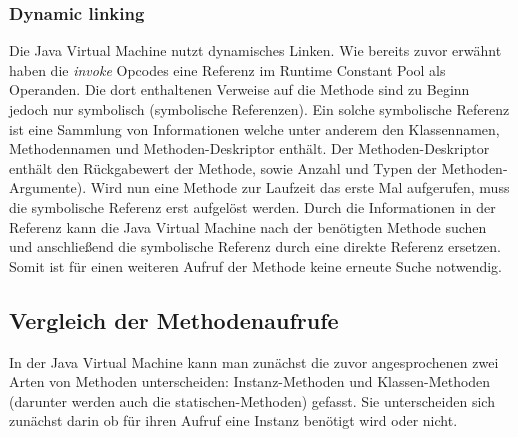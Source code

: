 \documentclass[conference]{IEEEtran}
\begin{document}
\subsubsection{Dynamic linking}
Die Java Virtual Machine nutzt dynamisches Linken. Wie bereits zuvor erwähnt haben die \textit{invoke} Opcodes eine Referenz im Runtime Constant Pool als Operanden. Die dort enthaltenen Verweise auf die Methode sind zu Beginn jedoch nur symbolisch (symbolische Referenzen). Ein solche symbolische Referenz ist eine Sammlung von Informationen welche unter anderem den Klassennamen, Methodennamen und Methoden-Deskriptor enthält. Der Methoden-Deskriptor enthält den Rückgabewert der Methode, sowie Anzahl und Typen der Methoden-Argumente). Wird nun eine Methode zur Laufzeit das erste Mal aufgerufen, muss die symbolische Referenz erst aufgelöst werden. Durch die Informationen in der Referenz kann die Java Virtual Machine nach der benötigten Methode suchen und anschließend die symbolische Referenz durch eine direkte Referenz ersetzen. Somit ist für einen weiteren Aufruf der Methode keine erneute Suche notwendig.\cite{Venners.1997}


\subsection{Vergleich der Methodenaufrufe}
In der Java Virtual Machine kann man zunächst die zuvor angesprochenen zwei Arten von Methoden unterscheiden: Instanz-Methoden und Klassen-Methoden (darunter werden auch die statischen-Methoden) gefasst. Sie unterscheiden sich zunächst darin ob für ihren Aufruf eine Instanz benötigt wird oder nicht. 
\end{document}
